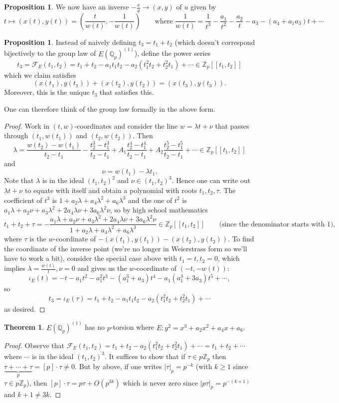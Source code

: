\documentclass{article}
\newcommand{\Z}{\mathbb{Z}}
\newcommand{\Q}{\mathbb{Q}}
\theoremstyle{definition}
\newtheorem{prop}[defn]{Proposition}
\newtheorem{thm}[defn]{Theorem}
\begin{document}
\begin{prop}
We now have an inverse $-\frac{x}{y}\rightarrow (x,y)$ of $u$ given by
\[
t\mapsto (x(t),y(t))= \left(\frac{t}{w(t)},-\frac{1}{w(t)}\right)\qquad \text{where }\frac{1}{w(t)}=\frac{1}{t^3}-\frac{a_1}{t^2}-\frac{a_2}{t}-a_3-(a_4+a_1a_3)t+\cdots
\]
\end{prop}
\begin{prop}
Instead of naively defining $t_3=t_1+t_2$ (which doesn't correspond bijectively to the group law of $E(\Q_p)^{(1)}$), define the power series
\[
t_3=\mathcal F_E(t_1,t_2)=t_1+t_2-a_1t_1t_2-a_2\left(t_1^2t_2+t_2^2t_1\right)+\cdots\in\Z_p[\![t_1,t_2]\!]
\]
which we claim satisfies
\[
(x(t_1),y(t_1))+(x(t_2),y(t_2))=(x(t_3),y(t_3)).
\]
Moreover, this is the unique $t_3$ that satisfies this.
\end{prop}
One can therefore think of the group law formally in the above form.
\begin{proof}
Work in $(t,w)$-coordinates and consider the line $w=\lambda t+\nu$ that passes through $(t_1,w(t_1))$ and $(t_2,w(t_2))$. Then
\[
\lambda=\frac{w(t_2)-w(t_1)}{t_2-t_1}-\frac{t_2^3-t_1^3}{t_2-t_1}+A_1\frac{t_2^4-t_1^4}{t_2-t_1}+A_2\frac{t_2^5-t_1^5}{t_2-t_1}+\cdots\in\Z_p[\![t_1,t_2]\!]
\]
and
\[
\nu=w(t_1)-\lambda t_1.
\]
Note that $\lambda$ is in the ideal $(t_1,t_2)^2$ and $\nu\in(t_1,t_2)^3$. Hence one can write out $\lambda t+\nu$ to equate with itself and obtain a polynomial with roots $t_1,t_2,\tau$. The coefficient of $t^3$ is $1+a_2\lambda+a_4\lambda^2+a_6\lambda^3$ and the one of $t^2$ is $a_1\lambda+a_2\nu+a_3\lambda^2+2a_4\lambda\nu+3a_6\lambda^2\nu$, so by high school mathematics
\[
t_1+t_2+\tau=-\frac{a_1\lambda+a_2\nu+a_3\lambda^2+2a_4\lambda\nu+3a_6\lambda^2\nu}{1+a_2\lambda+a_4\lambda^2+a_6\lambda^3}\in\Z_p[\![t_1,t_2]\!]\qquad\text{(since the denominator starts with 1)},
\]
where $\tau$ is the $w$-coordinate of $-(x(t_1),y(t_1))-(x(t_2),y(t_2))$. To find the coordinate of the inverse point (we're no longer in Weierstrass form so we'll have to work a bit), consider the special case above with $t_1=t,t_2=0$, which implies $\lambda=\frac{w(t)}{t},\nu=0$ and gives us the $w$-coordinate of $(-t,-w(t))$:
\[
\iota_E(t)=-t-a_1t^2-a_1^2t^3-(a_1^3+a_3)t^4-a_1(a_1^3+3a_3)t^5+\cdots,
\]
so
\[
t_3=\iota_E(\tau)=t_1+t_2-a_1t_1t_2-a_2(t_1^2t_2+t_2^2t_1)+\cdots
\]
as desired.
\end{proof}

\begin{thm}
\label{thm:EQp1hasnotorsion}
$E(\Q_p)^{(1)}$ has no $p$-torsion where $E:y^2=x^3+a_2x^2+a_4x+a_6$.
\end{thm}
\begin{proof}
Observe that $\mathcal F_E(t_1,t_2)=t_1+t_2-a_2(t_1^2t_2+t_2^2t_1)+\cdots=t_1+t_2+\cdots$ where $\cdots$ is in the ideal $(t_1,t_2)^3$. It suffices to show that if $\tau\in p\Z_p$ then $\underbrace{\tau+\cdots+\tau}_p=[p]\cdot \tau\neq 0$. But by above, if one writes $|\tau|_p=p^{-k}$ (with $k\geq 1$ since $\tau\in p\Z_p$), then $[p]\cdot \tau=p\tau+O(p^{3k})$ which is never zero since $|p\tau|_p=p^{-(k+1)}$ and $k+1\neq 3k$.
\end{proof}
\end{document}

